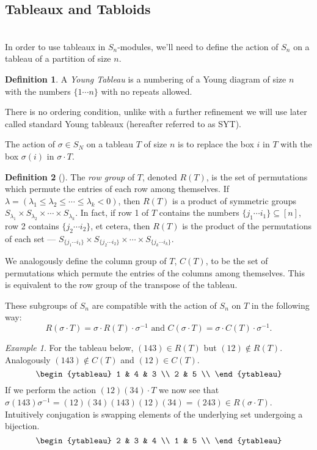 \documentclass[12pt,twoside]{reedthesis}
\theoremstyle{plain}   %
\theoremstyle{definition}
\newtheorem{defn}{Definition}[section]
\theoremstyle{remark}
\newtheorem{ex}{Example}[section]
\numberwithin{equation}{section}
\begin{document}
  \subsection{Tableaux and Tabloids} \hfill\\
  In order to use tableaux in $S_n$-modules, we'll need to define the action of $S_n$ on a tableau of a partition of size $n$.
  \begin{defn}
    A \emph{Young Tableau} is a numbering of a Young diagram of size $n$ with the numbers $\{1 \cdots n\}$ with no
    repeats allowed. \par
    There is no ordering condition, unlike with a further refinement we will use later called standard Young tableaux (hereafter referred to as SYT).
    
  \end{defn}
  The action of $\sigma \in S_N$ on a tableau $T$ of size $n$ is to replace the box $i$ in $T$ with the box $\sigma(i)$ in $\sigma \cdot T$.
  \begin{defn}[{\cite[Pg. 84]{fulton}}]
    The \emph{row group} of $T$, denoted $R(T)$, is the set of permutations which permute the entries of each row among themselves.
    If $\lambda = ( \lambda_1 \leq \lambda_2 \leq \cdots \leq \lambda_k < 0)$, then $R(T)$ is a product of symmetric groups
    $S_{\lambda_1} \times S_{\lambda_2} \times \cdots \times S_{\lambda_k}$.
    In fact, if row 1 of $T$ contains the numbers $\{ j_1 \cdots i_1\} \subseteq [n]$, row 2 contains $\{j_2 \cdots i_2 \}$, et cetera,
    then $R(T)$ is the product of the permutations of each set --- $S_{\{ j_1 \cdots i_1\}} \times S_{\{ j_2 \cdots i_2\}} \times \cdots \times S_{\{ j_k \cdots i_k\}}$.\par
    We analogously define the column group of $T$, $C(T)$, to be the set of permutations which permute the entries of the columns among themselves.
    This is equivalent to the row group of the transpose of the tableau.
  \end{defn}
  These subgroups of $S_n$ are compatible with the action of $S_n$ on $T$ in the following way:
  \[ R(\sigma \cdot T) = \sigma \cdot R(T) \cdot \sigma^{-1} \text{ and } C(\sigma \cdot T) = \sigma \cdot C(T) \cdot \sigma^{-1}.\]
  \begin{ex}
    For the tableau below,
    $(143) \in R(T)$ but $(12) \notin R(T)$.
    Analogously $(143) \notin C(T)$ and $(12) \in C(T)$.
    \[
      \begin{ytableau}
        1 & 4 & 3 \\
        2 & 5 \\
      \end{ytableau}
    \]
    If we perform the action $(12)(34) \cdot T$ we now see that $\sigma (143) \sigma^{-1} = (12)(34) (143) (12)(34) = (243) \in R(\sigma \cdot T)$.
    Intuitively conjugation is swapping elements of the underlying set undergoing a bijection.
    \[
      \begin{ytableau}
        2 & 3 & 4 \\
        1 & 5 \\
      \end{ytableau}
    \]
  \end{ex}
\end{document}
